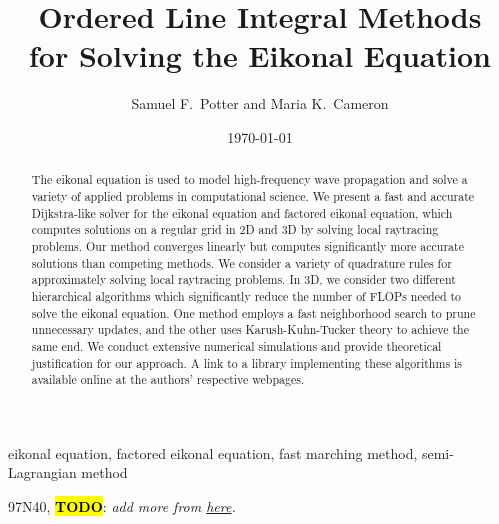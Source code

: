 \documentclass[eikonal.tex]{subfiles}
\begin{document}
\title{Ordered Line Integral Methods \\ for Solving the Eikonal Equation}
\author{Samuel F.\ Potter and Maria K.\ Cameron}
\date{\today}

\maketitle

\begin{abstract}
  The eikonal equation is used to model high-frequency wave
  propagation and solve a variety of applied problems in computational
  science. We present a fast and accurate Dijkstra-like solver for the
  eikonal equation and factored eikonal equation, which computes
  solutions on a regular grid in 2D and 3D by solving local raytracing
  problems. Our method converges linearly but computes significantly
  more accurate solutions than competing methods. We consider a
  variety of quadrature rules for approximately solving local
  raytracing problems. In 3D, we consider two different hierarchical
  algorithms which significantly reduce the number of FLOPs needed to
  solve the eikonal equation. One method employs a fast neighborhood
  search to prune unnecessary updates, and the other uses
  Karush-Kuhn-Tucker theory to achieve the same end. We conduct
  extensive numerical simulations and provide theoretical
  justification for our approach. A link to a library implementing
  these algorithms is available online at the authors' respective
  webpages.
\end{abstract}

\begin{keywords}
  eikonal equation, factored eikonal equation, fast marching method,
  semi-Lagrangian method
\end{keywords}

\begin{AMS}
  97N40, \hl{\textbf{TODO}}: \emph{add more from
    \href{https://mathscinet.ams.org/msc/pdfs/classifications2010.pdf}{here}.} %
\end{AMS}
\end{document}
